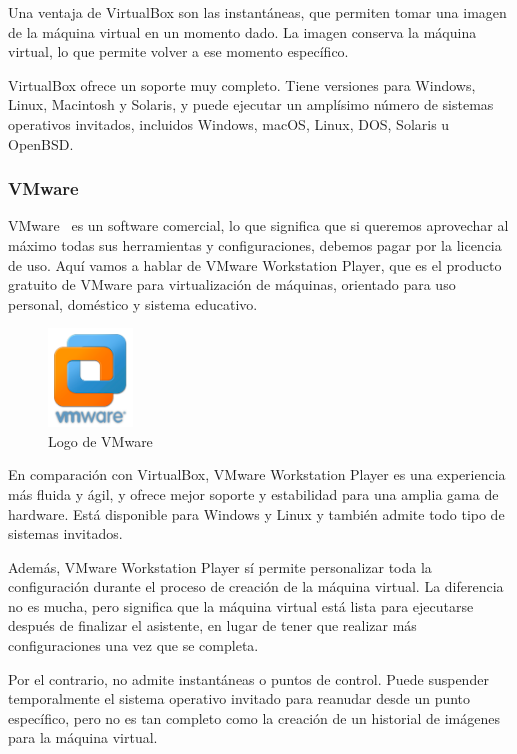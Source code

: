 	Una ventaja de VirtualBox son las instantáneas, que permiten tomar una imagen de la máquina virtual en un momento dado. La imagen conserva la máquina virtual, lo que permite volver a ese momento específico.

	VirtualBox ofrece un soporte muy completo. Tiene versiones para Windows, Linux, Macintosh y Solaris, y puede ejecutar un amplísimo número de sistemas operativos invitados, incluidos Windows, macOS, Linux, DOS, Solaris u OpenBSD.

\subsubsection{VMware}
	VMware~\cite{vmware} es un software comercial, lo que significa que si queremos aprovechar al máximo todas sus herramientas y configuraciones, debemos pagar por la licencia de uso. Aquí vamos a hablar de VMware Workstation Player, que es el producto gratuito de VMware para virtualización de máquinas, orientado para uso personal, doméstico y sistema educativo. 

	\begin{figure}[h]
	\centering
	\includegraphics[width=0.2\textwidth]{../imgs/EdA/vmware.png}
	\caption{Logo de VMware}
	\label{fig:vmware}
	\end{figure}

	En comparación con VirtualBox, VMware Workstation Player es una experiencia más fluida y ágil, y ofrece mejor soporte y estabilidad para una amplia gama de hardware. Está disponible para Windows y Linux y también admite todo tipo de sistemas invitados.~\cite{versus}

	Además, VMware Workstation Player sí permite personalizar toda la configuración durante el proceso de creación de la máquina virtual. La diferencia no es mucha, pero significa que la máquina virtual está lista para ejecutarse después de finalizar el asistente, en lugar de tener que realizar más configuraciones una vez que se completa.

	Por el contrario, no admite instantáneas o puntos de control. Puede suspender temporalmente el sistema operativo invitado para reanudar desde un punto específico, pero no es tan completo como la creación de un historial de imágenes para la máquina virtual.

